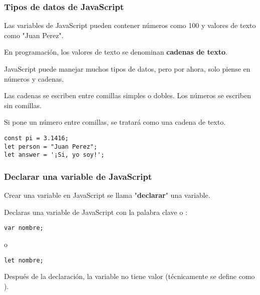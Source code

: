 \begin{frame}[fragile]
  \frametitle{Tipos de datos de JavaScript}

  Las variables de JavaScript pueden contener números como
  100 y valores de texto como "Juan Perez".

  \vspace{\baselineskip}
  En programación, los valores de texto se denominan \textbf{cadenas de
  texto}.

  \vspace{\baselineskip}
  JavaScript puede manejar muchos tipos de datos, pero por ahora,
  solo piense en números y cadenas.

  \vspace{\baselineskip}
  Las cadenas se escriben entre comillas simples o dobles.
  Los números se escriben sin comillas.

  \vspace{\baselineskip}
  Si pone un número entre comillas, se tratará como una cadena de texto.

  \vspace{\baselineskip}
  \begin{lstlisting}
const pi = 3.1416;
let person = "Juan Perez";
let answer = '¡Si, yo soy!';
  \end{lstlisting}
\end{frame}

\begin{frame}[fragile]
  \frametitle{Declarar una variable de JavaScript}

  Crear una variable en JavaScript se llama "\textbf{declarar}"
  una variable.

  \vspace{\baselineskip}
  Declaras una variable de JavaScript con la palabra clave 
  o :

  \vspace{\baselineskip}
  \begin{lstlisting}
var nombre;
  \end{lstlisting}
o
  \begin{lstlisting}
let nombre;
  \end{lstlisting}

  \vspace{\baselineskip}
  Después de la declaración, la variable no tiene valor
  (técnicamente se define como ).
\end{frame}

